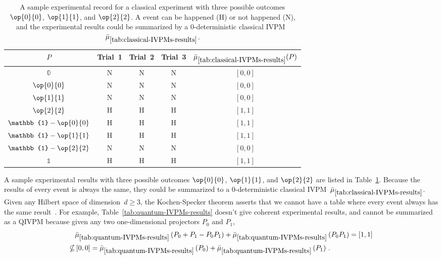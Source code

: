 \documentclass[english,reprint, aps, prl,superscriptaddress, showpacs,
showkeys, longbibliography, amsmath, amssymb, floatfix]{revtex4-1}
\theoremstyle{plain}
\theoremstyle{definition}
\newcommand{\imposs}{\ensuremath{\left[0,0\right]}}
\newcommand{\necess}{\ensuremath{\left[1,1\right]}}
\newcommand{\proj}[1]{\op{#1}{#1}}
\newcommand{\happen}{\text{H}}
\newcommand{\notHappen}{\text{N}}
\begin{document}
\begin{table}
\noindent \centering{}\caption{\label{tab:classical-IVPMs-results}A sample experimental record for
a classical experiment with three possible outcomes $\proj{0}$, $\proj{1}$,
and $\proj{2}$. A event can be happened ($\happen$) or not happened
($\notHappen$), and the experimental results could be summarized
by a $0$-deterministic classical IVPM~$\bar{\mu}_{\ref{tab:classical-IVPMs-results}}$.}
\begin{tabular}{ccccc}
\toprule 
\addlinespace
$P$  & Trial~1 & Trial~2 & Trial~3 & $\bar{\mu}_{\ref{tab:classical-IVPMs-results}}(P)$\tabularnewline
\midrule
\midrule 
\addlinespace
$\mathbb{0}$  & $\notHappen$ & $\notHappen$ & $\notHappen$ & $\imposs$\tabularnewline
\midrule 
\addlinespace
$\proj{0}$  & $\notHappen$ & $\notHappen$ & $\notHappen$ & $\imposs$\tabularnewline
\midrule 
\addlinespace
$\proj{1}$  & $\notHappen$ & $\notHappen$ & $\notHappen$ & $\imposs$\tabularnewline
\midrule 
\addlinespace
$\proj{2}$ & $\happen$ & $\happen$ & $\happen$ & $\necess$\tabularnewline
\midrule 
\addlinespace
$\mathbb{1}-\proj{0}$  & $\happen$ & $\happen$ & $\happen$ & $\necess$\tabularnewline
\midrule 
\addlinespace
$\mathbb{1}-\proj{1}$  & $\happen$ & $\happen$ & $\happen$ & $\necess$\tabularnewline
\midrule 
\addlinespace
$\mathbb{1}-\proj{2}$ & $\notHappen$ & $\notHappen$ & $\notHappen$ & $\imposs$\tabularnewline
\midrule 
\addlinespace
$\mathbb{1}$  & $\happen$ & $\happen$ & $\happen$ & $\necess$\tabularnewline
\bottomrule
\end{tabular}
\end{table}
A sample experimental results with three possible outcomes $\proj{0}$,
$\proj{1}$, and $\proj{2}$ are listed in Table~\ref{tab:classical-IVPMs-results}.
Because the results of every event is always the same, they could
be summarized to a $0$-deterministic classical IVPM~$\bar{\mu}_{\ref{tab:classical-IVPMs-results}}$.
Given any Hilbert space of dimension~$d\ge3$, the Kochen-Specker
theorem asserts that we cannot have a table where every event always
has the same result~\cite{THOS2017}. For example, Table~\ref{tab:quantum-IVPMs-results}
doesn't give coherent experimental results, and cannot be summarized
as a QIVPM because given any two one-dimensional projectors $P_{0}$
and $P_{1}$, 
\begin{equation}
\begin{aligned} & \bar{\mu}_{\ref{tab:quantum-IVPMs-results}}\left(P_{0}+P_{1}-P_{0}P_{1}\right)+\bar{\mu}_{\ref{tab:quantum-IVPMs-results}}\left(P_{0}P_{1}\right)=\necess\\
\nsubseteq & \imposs=\bar{\mu}_{\ref{tab:quantum-IVPMs-results}}\left(P_{0}\right)+\bar{\mu}_{\ref{tab:quantum-IVPMs-results}}\left(P_{1}\right)\,.
\end{aligned}
\end{equation}
\end{document}
